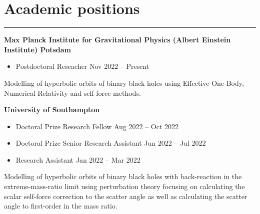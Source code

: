 \documentclass[10.5pt, oneside]{article}   	%
\begin{document}
 
 
\begin{center}
\huge
\href{mailto:oliver.long@aei.mpg.de}{} \:
\textcolor{Orcidcolour}{\href{https://orcid.org/0000-0002-3897-9272}{}} \:
\textcolor{RGcolour}{\href{https://www.researchgate.net/profile/Oliver-Long-3}{}} \:
\textcolor{LIcolour}{\href{https://www.linkedin.com/in/oliverflong/}{}} \:
\href{https://scholar.google.com/citations?user=92pSUO0AAAAJ&hl=en}{} \:
\href{https://oliverlong.info}{}
\end{center}

 \vspace{1mm}


{\color{Sectioncolour}
\section*{Academic positions}
\vspace{-3mm}
\noindent\rule{\linewidth}{0.6pt}}

\textbf{Max Planck Institute for Gravitational Physics (Albert Einstein Institute) Potsdam} \\
\vspace{-5mm}
\begin{itemize}
\item Postdoctoral Reseacher \hfill Nov 2022 -- Present
\end{itemize}
Modelling of hyperbolic orbits of binary black holes using Effective One-Body, Numerical Relativity and self-force methods.

\textbf{University of Southampton} \\
\vspace{-5mm}
\begin{itemize}
\item Doctoral Prize Research Fellow \hfill Aug 2022 -- Oct 2022
\item Doctoral Prize Senior Research Assistant \hfill Jun 2022 -- Jul 2022
\item Research Assistant \hfill Jan 2022 -- Mar 2022
\end{itemize}
Modelling of hyperbolic orbits of binary black holes with back-reaction in the extreme-mass-ratio limit using perturbation theory focusing on calculating the scalar self-force correction to the scatter angle as well as calculating the scatter angle to first-order in the mass ratio.
\end{document}
